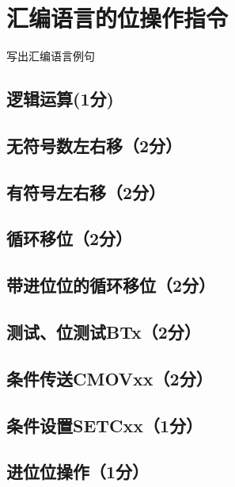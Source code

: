\section{汇编语言的位操作指令}
\begin{center}
    写出汇编语言例句
\end{center}

\subsection{逻辑运算(1分)}
\subsection{无符号数左右移（2分）}

\subsection{有符号左右移（2分）}

\subsection{循环移位（2分）}

\subsection{带进位位的循环移位（2分）}

\subsection{测试、位测试BTx（2分）}

\subsection{条件传送CMOVxx（2分）}

\subsection{条件设置SETCxx（1分）}

\subsection{进位位操作（1分）}